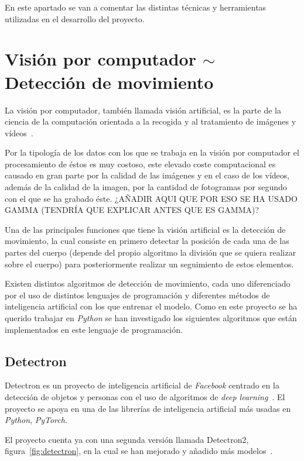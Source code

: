
En este apartado se van a comentar las distintas técnicas y herramientas utilizadas en el desarrollo del proyecto.

\section{Visión por computador $\sim$ Detección de movimiento}
La visión por computador, también llamada visión artificial, es la parte de la ciencia de la computación orientada a la recogida y al tratamiento de imágenes y vídeos~\cite{wiki:visionartificial}.

Por la tipología de los datos con los que se trabaja en la visión por computador el procesamiento de éstos es muy costoso, este elevado coste computacional es causado en gran parte por la calidad de las imágenes y en el caso de los vídeos, además de la calidad de la imagen, por la cantidad de fotogramas por segundo con el que se ha grabado éste. ¿AÑADIR AQUI QUE POR ESO SE HA USADO GAMMA (TENDRÍA QUE EXPLICAR ANTES QUE ES GAMMA)?

Una de las principales funciones que tiene la visión artificial es la detección de movimiento, la cual consiste en primero detectar la posición de cada una de las partes del cuerpo (depende del propio algoritmo la división que se quiera realizar sobre el cuerpo) para posteriormente realizar un seguimiento de estos elementos.

Existen distintos algoritmos de detección de movimiento, cada uno diferenciado por el uso de distintos lenguajes de programación y diferentes métodos de inteligencia artificial con los que entrenar el modelo. Como en este proyecto se ha querido trabajar en \textit{Python} se han investigado los siguientes algoritmos que están implementados en este lenguaje de programación. 

\subsection{Detectron}\label{dectectron}
Detectron es un proyecto de inteligencia artificial de \textit{Facebook} centrado en la detección de objetos y personas con el uso de algoritmos de \textit{deep learning}~\cite{Detectron2018}. El proyecto se apoya en una de las librerías de inteligencia artificial más usadas en \textit{Python}, \textit{PyTorch}.

El proyecto cuenta ya con una segunda versión llamada Detectron2, figura~\ref{fig:detectron}, en la cual se han mejorado y añadido más modelos~\cite{wu2019detectron2}.

